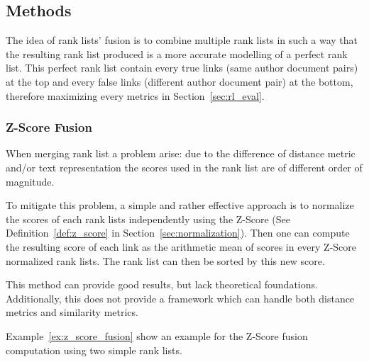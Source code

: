\subsection{Methods \label{sec:rank_lists_fusion}}

The idea of rank lists' fusion is to combine multiple rank lists in such a way that the resulting rank list produced is a more accurate modelling of a perfect rank list.
This perfect rank list contain every true links (same author document pairs) at the top and every false links (different author document pair) at the bottom, therefore maximizing every metrics in Section~\ref{sec:rl_eval}.

\subsubsection{Z-Score Fusion}

When merging rank list a problem arise: due to the difference of distance metric and/or text representation the scores used in the rank list are of different order of magnitude.

To mitigate this problem, a simple and rather effective approach is to normalize the scores of each rank lists independently using the Z-Score (See Definition~\ref{def:z_score} in Section~\ref{sec:normalization}).
Then one can compute the resulting score of each link as the arithmetic mean of scores in every Z-Score normalized rank lists.
The rank list can then be sorted by this new score.

This method can provide good results, but lack theoretical foundations.
Additionally, this does not provide a framework which can handle both distance metrics and similarity metrics.

Example~\ref{ex:z_score_fusion} show an example for the Z-Score fusion computation using two simple rank lists.

